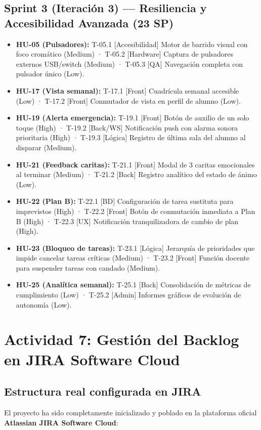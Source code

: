 \documentclass[11pt,a4paper]{article}
\newcommand{\hl}[1]{\textcolor{gblue}{\textbf{#1}}}
\begin{document}
\subsection{Sprint 3 (Iteración 3) — Resiliencia y Accesibilidad Avanzada (23 SP)}
\begin{itemize}
\item \textbf{HU-05 (Pulsadores):} T-05.1 [Accesibilidad] Motor de barrido visual con foco cromático (Medium) · T-05.2 [Hardware] Captura de pulsadores externos USB/switch (Medium) · T-05.3 [QA] Navegación completa con pulsador único (Low).
\item \textbf{HU-17 (Vista semanal):} T-17.1 [Front] Cuadrícula semanal accesible (Low) · T-17.2 [Front] Conmutador de vista en perfil de alumno (Low).
\item \textbf{HU-19 (Alerta emergencia):} T-19.1 [Front] Botón de auxilio de un solo toque (High) · T-19.2 [Back/WS] Notificación push con alarma sonora prioritaria (High) · T-19.3 [Lógica] Registro de última sala del alumno al disparar (Medium).
\item \textbf{HU-21 (Feedback caritas):} T-21.1 [Front] Modal de 3 caritas emocionales al terminar (Medium) · T-21.2 [Back] Registro analítico del estado de ánimo (Low).
\item \textbf{HU-22 (Plan B):} T-22.1 [BD] Configuración de tarea sustituta para imprevistos (High) · T-22.2 [Front] Botón de conmutación inmediata a Plan B (High) · T-22.3 [UX] Notificación tranquilizadora de cambio de plan (High).
\item \textbf{HU-23 (Bloqueo de tareas):} T-23.1 [Lógica] Jerarquía de prioridades que impide cancelar tareas críticas (Medium) · T-23.2 [Front] Función docente para suspender tareas con candado (Medium).
\item \textbf{HU-25 (Analítica semanal):} T-25.1 [Back] Consolidación de métricas de cumplimiento (Low) · T-25.2 [Admin] Informes gráficos de evolución de autonomía (Low).
\end{itemize}

\section{Actividad 7: Gestión del Backlog en JIRA Software Cloud}
\subsection{Estructura real configurada en JIRA}
El proyecto ha sido completamente inicializado y poblado en la plataforma oficial \hl{Atlassian JIRA Software Cloud}:
\end{document}
